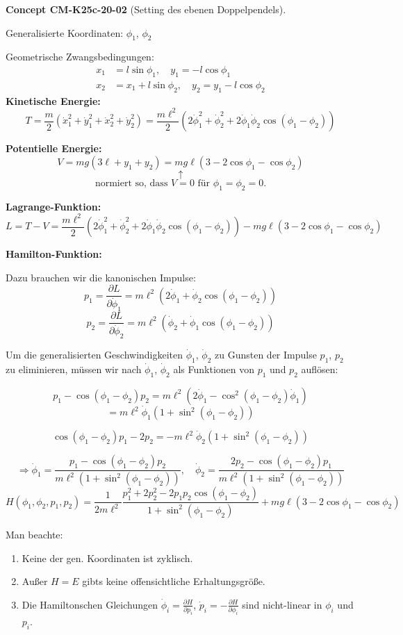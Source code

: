 \documentclass[10pt, letterpaper]{article}
\newcommand{\CustomHeading}[3]{%
  \par\medskip\noindent%
  \textbf{#1 #2} \textnormal{(#3)}.\enskip%
}
\newenvironment{CONC}[2]{\begin{unitbox}\CustomHeading{Concept}{#1}{#2}}{\end{unitbox}}
\begin{document}
\begin{CONC}{CM-K25c-20-02}{Setting des ebenen Doppelpendels}
Generalisierte Koordinaten: $\phi_1$, $\phi_2$

Geometrische Zwangsbedingungen:
\begin{align*}
x_1 &= l\sin\phi_1, \quad y_1=-l\cos\phi_1\\
x_2 &= x_1+l\sin\phi_2, \quad y_2=y_1-l\cos\phi_2
\end{align*}
\noindent\textbf{Kinetische Energie:}
\[T= \frac{m}{2}(\dot{x}_1^2 + \dot{y}_1^2 + \dot{x}_2^2 + \dot{y}_2^2) = \frac{m\ell^2}{2}(2\dot{\phi}_1^2 + \dot{\phi}_2^2 + 2\dot{\phi}_1\dot{\phi}_2\cos(\phi_1-\phi_2))\]

\noindent\textbf{Potentielle Energie:}
\[V = mg(3\ell + y_1 + y_2) = mg\ell(3-2\cos\phi_1-\cos\phi_2)\]
\[\uparrow\]
\[\text{normiert so, dass }V=0\text{ für }\phi_1=\phi_2=0.\]

\noindent\textbf{Lagrange-Funktion:}
\[L = T-V = \frac{m\ell^2}{2}(2\dot{\phi}_1^2 + \dot{\phi}_2^2 + 2\dot{\phi}_1\dot{\phi}_2\cos(\phi_1-\phi_2)) - mg\ell(3-2\cos\phi_1-\cos\phi_2)\]

\noindent\textbf{Hamilton-Funktion:}

Dazu brauchen wir die kanonischen Impulse:
\[p_1 = \frac{\partial L}{\partial\dot{\phi}_1} = m\ell^2(2\dot{\phi}_1 + \dot{\phi}_2\cos(\phi_1-\phi_2))\]
\[p_2 = \frac{\partial L}{\partial\dot{\phi}_2} = m\ell^2(\dot{\phi}_2 + \dot{\phi}_1\cos(\phi_1-\phi_2))\]

Um die generalisierten Geschwindigkeiten $\dot{\phi}_1$, $\dot{\phi}_2$ zu Gunsten der Impulse $p_1$, $p_2$ zu eliminieren, müssen wir nach $\dot{\phi}_1$, $\dot{\phi}_2$ als Funktionen von $p_1$ und $p_2$ auflösen:

\[p_1-\cos(\phi_1-\phi_2)p_2 = m\ell^2(2\dot{\phi}_1-\cos^2(\phi_1-\phi_2)\dot{\phi}_1)\]
\[= m\ell^2\dot{\phi}_1(1+\sin^2(\phi_1-\phi_2))\]

\[\cos(\phi_1-\phi_2)p_1-2p_2 = -m\ell^2\dot{\phi}_2(1+\sin^2(\phi_1-\phi_2))\]

\[\Rightarrow \dot{\phi}_1 = \frac{p_1-\cos(\phi_1-\phi_2)p_2}{m\ell^2(1+\sin^2(\phi_1-\phi_2))}, \quad \dot{\phi}_2 = \frac{2p_2-\cos(\phi_1-\phi_2)p_1}{m\ell^2(1+\sin^2(\phi_1-\phi_2))}\]
\[H(\phi_1, \phi_2, p_1, p_2) = \frac{1}{2m\ell^2}\frac{p_1^2 + 2p_2^2 - 2p_1p_2\cos(\phi_1-\phi_2)}{1 + \sin^2(\phi_1-\phi_2)} + mg\ell(3-2\cos\phi_1-\cos\phi_2)\]

Man beachte:
\begin{enumerate}
\item Keine der gen. Koordinaten ist zyklisch.
\item Außer $H=E$ gibts keine offensichtliche Erhaltungsgröße.
\item Die Hamiltonschen Gleichungen $\dot{\phi}_i = \frac{\partial H}{\partial p_i}$, $\dot{p}_i = -\frac{\partial H}{\partial \phi_i}$ sind nicht-linear in $\phi_i$ und $p_i$.
\end{enumerate}
\end{CONC}
\end{document}
